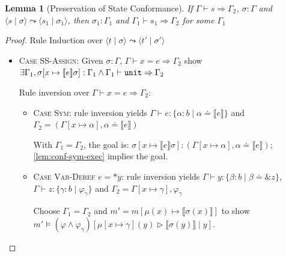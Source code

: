 \documentclass[twoside, english]{sdqthesis}
\newcommand{\tuple}[2]{\langle #1 \mid #2 \rangle}
\newcommand{\bbracket}[1]{\llbracket #1 \rrbracket}
\newcommand{\tr}[0]{\triangleright}
\newtheorem{lemma}[theorem]{Lemma}
\theoremstyle{definition}
\begin{document}
\begin{lemma}[Preservation of State Conformance]
  If $\Gamma \vdash s \Rightarrow \Gamma_2$, $\sigma : \Gamma$ and $\tuple{s}{\sigma} \leadsto \tuple{s_1}{\sigma_1}$, then  $\sigma_1 : \Gamma_1$ and $\Gamma_1 \vdash s_1 \Rightarrow \Gamma_2$ for some $\Gamma_1$
\end{lemma}
\begin{proof} Rule Induction over $\tuple{t}{\sigma} \leadsto \tuple{t'}{\sigma'}$
\begin{itemize}
  \item \textsc{Case SS-Assign}:
    Given $\sigma : \Gamma$, $\Gamma \vdash x = e \Rightarrow \Gamma_2$
    show $\exists \Gamma_1, \sigma[ x \mapsto \llbracket e \rrbracket \sigma] : \Gamma_1 \wedge \Gamma_1 \vdash \code{unit} \Rightarrow \Gamma_2 $

    Rule inversion over $\Gamma \vdash x = e \Rightarrow \Gamma_2$:
    \begin{itemize}
      \item \textsc{Case Sym}: rule inversion yields $\Gamma \vdash e: \{ \alpha : b \mid \alpha \doteq \llbracket e \rrbracket \}$ and $\Gamma_2 = (\Gamma[x \mapsto \alpha], \alpha \doteq \llbracket e \rrbracket)$

      With $\Gamma_1 = \Gamma_2$, the goal is: $\sigma[x \mapsto \bbracket{e}\sigma ] : (\Gamma[x \mapsto \alpha], \alpha \doteq \llbracket e \rrbracket)$; \cref{lem:conf-sym-exec} implies the goal.
      \item \textsc{Case Var-Deref} $e = *y$:
        rule inversion yields $\Gamma \vdash y : \{\beta : b \mid \beta \doteq \&z\}$, $\Gamma \vdash z : \{\gamma : b \mid \varphi_\gamma\}$ and $\Gamma_2 = \Gamma[x \mapsto \gamma], \varphi_\gamma$

        Choose $\Gamma_1 = \Gamma_2$ and $ m' = m[\mu(x) \mapsto \bbracket{\sigma(x)}] $ to show 
        $ m' \vDash (\varphi \wedge \varphi_\gamma)[\mu[x \mapsto \gamma](y) \tr \bbracket{\sigma(y)} \mid y]$.


\end{itemize}
\end{itemize}
\end{proof}
\end{document}
